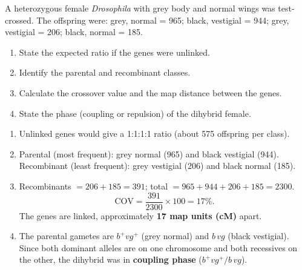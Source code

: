 \documentclass[11pt]{article}
\begin{document}
\begin{exercice}
A heterozygous female \emph{Drosophila} with grey body and normal wings was test-crossed. The offspring were: grey, normal = 965; black, vestigial = 944; grey, vestigial = 206; black, normal = 185.
\begin{enumerate}
\item State the expected ratio if the genes were unlinked.
\item Identify the parental and recombinant classes.
\item Calculate the crossover value and the map distance between the genes.
\item State the phase (coupling or repulsion) of the dihybrid female.
\end{enumerate}
\end{exercice}

\begin{corrige}[Exercise 1]
\begin{enumerate}
\item Unlinked genes would give a 1:1:1:1 ratio (about 575 offspring per class).
\item Parental (most frequent): grey normal (965) and black vestigial (944). Recombinant (least frequent): grey vestigial (206) and black normal (185).
\item Recombinants $= 206 + 185 = 391$; total $= 965 + 944 + 206 + 185 = 2300$.
\[ \text{COV} = \frac{391}{2300} \times 100 = 17\%. \]
The genes are linked, approximately \textbf{17 map units (cM)} apart.
\item The parental gametes are $b^+vg^+$ (grey normal) and $b\,vg$ (black vestigial). Since both dominant alleles are on one chromosome and both recessives on the other, the dihybrid was in \textbf{coupling phase} ($b^+vg^+/b\,vg$).
\end{enumerate}
\end{corrige}
\end{document}

